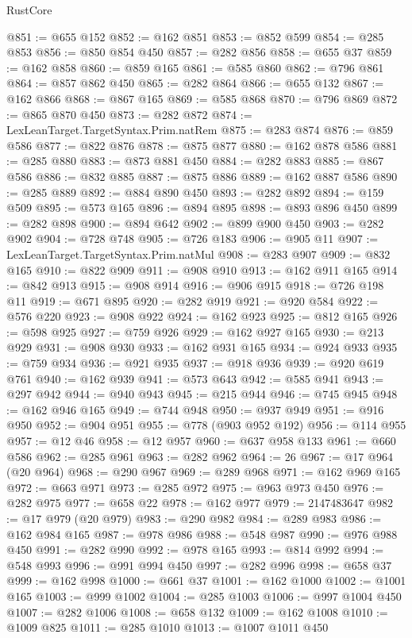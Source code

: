 \begin{lexlean}{RustCore}
\begin{coremodule}
@851 := @655 @152
@852 := @162 @851
@853 := @852 @599
@854 := @285 @853
@856 := @850 @854 @450
@857 := @282 @856
@858 := @655 @37
@859 := @162 @858
@860 := @859 @165
@861 := @585 @860
@862 := @796 @861
@864 := @857 @862 @450
@865 := @282 @864
@866 := @655 @132
@867 := @162 @866
@868 := @867 @165
@869 := @585 @868
@870 := @796 @869
@872 := @865 @870 @450
@873 := @282 @872
@874 := LexLeanTarget.TargetSyntax.Prim.natRem
@875 := @283 @874
@876 := @859 @586
@877 := @822 @876
@878 := @875 @877
@880 := @162 @878 @586
@881 := @285 @880
@883 := @873 @881 @450
@884 := @282 @883
@885 := @867 @586
@886 := @832 @885
@887 := @875 @886
@889 := @162 @887 @586
@890 := @285 @889
@892 := @884 @890 @450
@893 := @282 @892
@894 := @159 @509
@895 := @573 @165
@896 := @894 @895
@898 := @893 @896 @450
@899 := @282 @898
@900 := @894 @642
@902 := @899 @900 @450
@903 := @282 @902
@904 := @728 @748
@905 := @726 @183
@906 := @905 @11
@907 := LexLeanTarget.TargetSyntax.Prim.natMul
@908 := @283 @907
@909 := @832 @165
@910 := @822 @909
@911 := @908 @910
@913 := @162 @911 @165
@914 := @842 @913
@915 := @908 @914
@916 := @906 @915
@918 := @726 @198 @11
@919 := @671 @895
@920 := @282 @919
@921 := @920 @584
@922 := @576 @220
@923 := @908 @922
@924 := @162 @923
@925 := @812 @165
@926 := @598 @925
@927 := @759 @926
@929 := @162 @927 @165
@930 := @213 @929
@931 := @908 @930
@933 := @162 @931 @165
@934 := @924 @933
@935 := @759 @934
@936 := @921 @935
@937 := @918 @936
@939 := @920 @619 @761
@940 := @162 @939
@941 := @573 @643
@942 := @585 @941
@943 := @297 @942
@944 := @940 @943
@945 := @215 @944
@946 := @745 @945
@948 := @162 @946 @165
@949 := @744 @948
@950 := @937 @949
@951 := @916 @950
@952 := @904 @951
@955 := @778 (@903 @952 @192)
@956 := @114 @955
@957 := @12 @46
@958 := @12 @957
@960 := @637 @958 @133
@961 := @660 @586
@962 := @285 @961
@963 := @282 @962
@964 := 26
@967 := @17 @964 (@20 @964)
@968 := @290 @967
@969 := @289 @968
@971 := @162 @969 @165
@972 := @663 @971
@973 := @285 @972
@975 := @963 @973 @450
@976 := @282 @975
@977 := @658 @22
@978 := @162 @977
@979 := 2147483647
@982 := @17 @979 (@20 @979)
@983 := @290 @982
@984 := @289 @983
@986 := @162 @984 @165
@987 := @978 @986
@988 := @548 @987
@990 := @976 @988 @450
@991 := @282 @990
@992 := @978 @165
@993 := @814 @992
@994 := @548 @993
@996 := @991 @994 @450
@997 := @282 @996
@998 := @658 @37
@999 := @162 @998
@1000 := @661 @37
@1001 := @162 @1000
@1002 := @1001 @165
@1003 := @999 @1002
@1004 := @285 @1003
@1006 := @997 @1004 @450
@1007 := @282 @1006
@1008 := @658 @132
@1009 := @162 @1008
@1010 := @1009 @825
@1011 := @285 @1010
@1013 := @1007 @1011 @450

\end{coremodule}
\end{lexlean}

